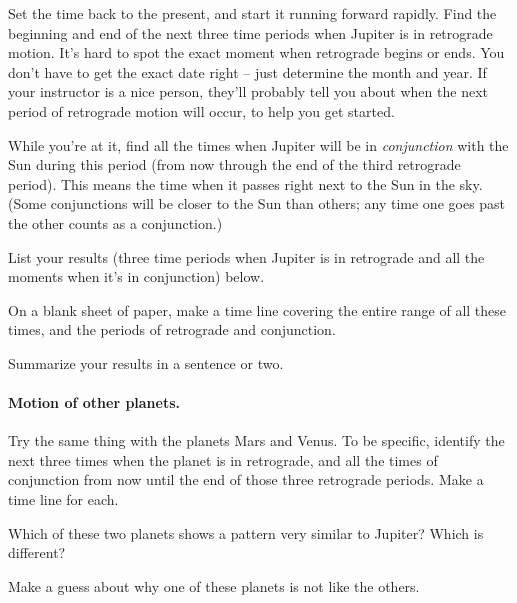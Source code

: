 Set the time back to the present, and start it running forward
rapidly. Find the beginning and end of the next three time periods
when Jupiter is in retrograde motion. It's hard to spot the
exact moment when retrograde begins or ends. You don't
have to get the exact date right -- just determine the month and
year. If your instructor is a nice person, they'll probably tell you about
when the next period of retrograde motion will occur, to help you get
started.


While you're at it, find all the times 
when Jupiter will be
in \textit{conjunction} with the Sun during this period (from
now through the end of the third retrograde period). 
This means the time when
it passes right next to the Sun in the sky. (Some conjunctions will be closer
to the Sun than others; any time one goes past the other counts as a
conjunction.)

List your results (three time periods when Jupiter is in retrograde
and all the moments when it's in conjunction) below.

\answerspace{3in}

On a blank sheet of paper, make a time line covering the entire
range of all these times, and the periods of retrograde and conjunction.

Summarize your results in a sentence or two.

\answerspace{1in}

\paragraph{Motion of other planets.}
Try the same thing with the planets Mars and Venus.
To be specific, identify the next three times when the planet is 
in retrograde, and all the times of conjunction from now until the end of those
three
retrograde periods. Make a time line for each.

\answerspace{5in}

Which of these two planets shows a pattern very similar to Jupiter?
Which is different?

\answerspace{1in}

Make a guess about why one of these planets is not like the others.

\answerspace{1in}



